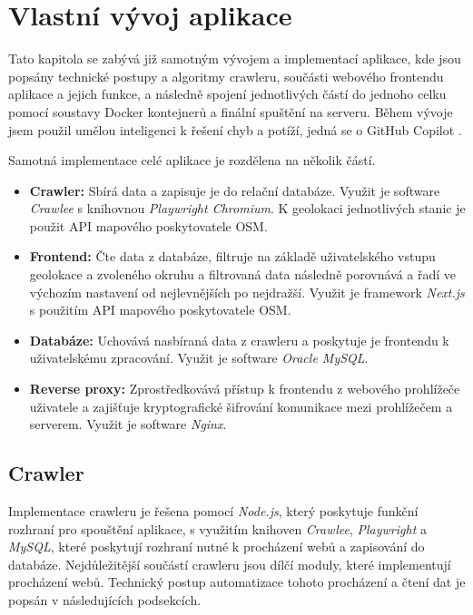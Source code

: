 \chapter{Vlastní vývoj aplikace}
\label{ch:development}

Tato kapitola se zabývá již samotným vývojem a implementací aplikace,
kde jsou popsány technické postupy a algoritmy crawleru, součásti
webového frontendu aplikace a jejich funkce, a následně spojení jednotlivých
částí do jednoho celku pomocí soustavy Docker kontejnerů a finální spuštění
na serveru. Během vývoje jsem použil umělou inteligenci k řešení chyb
a potíží, jedná se o GitHub Copilot \cite{shCgjU2g2YA0ff8T}. %

Samotná implementace celé aplikace je rozdělena na několik částí.

\begin{itemize}
    \item \textbf{Crawler:} Sbírá data a zapisuje je do relační databáze.
        Využit je software \emph{Crawlee} s knihovnou \emph{Playwright
        Chromium}. K geolokaci jednotlivých stanic je použit API mapového
        poskytovatele OSM.
    \item \textbf{Frontend:} Čte data z databáze, filtruje na základě
        uživatelského vstupu geolokace a zvoleného okruhu a filtrovaná
        data následně porovnává a řadí ve výchozím nastavení od nejlevnějších
        po nejdražší. Využit je framework \emph{Next.js} s použitím API
        mapového poskytovatele OSM.
    \item \textbf{Databáze:} Uchovává nasbíraná data z crawleru a poskytuje je
        frontendu k uživatelskému zpracování. Využit je software
        \emph{Oracle MySQL}.
    \item \textbf{Reverse proxy:} Zprostředkovává přístup k frontendu
        z webového prohlížeče uživatele a zajišťuje kryptografické
        šifrování komunikace mezi prohlížečem a serverem. Využit je software
        \emph{Nginx}.
\end{itemize}

\section{Crawler}
\label{sec:development-crawler}

Implementace crawleru je řešena pomocí \emph{Node.js}, který poskytuje funkční
rozhraní pro spouštění aplikace, s využitím knihoven \emph{Crawlee},
\emph{Playwright} a \emph{MySQL}, které poskytují rozhraní nutné k procházení
webů a zapisování do databáze. Nejdůležitější součástí crawleru jsou dílčí
moduly, které implementují procházení webů. Technický postup automatizace
tohoto procházení a čtení dat je popsán v následujících podsekcích.

